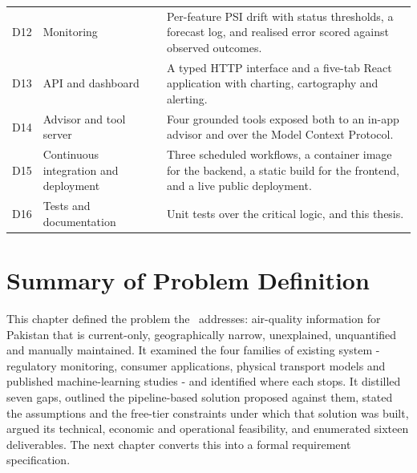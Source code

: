 \begin{xltabular}{\textwidth}{Q{1.3cm} P{4.9cm} Y}
D12 & Monitoring & Per-feature PSI drift with status thresholds, a forecast log,
and realised error scored against observed outcomes. \\
D13 & API and dashboard & A typed HTTP interface and a five-tab React
application with charting, cartography and alerting. \\
D14 & Advisor and tool server & Four grounded tools exposed both to an in-app
advisor and over the Model Context Protocol. \\
D15 & Continuous integration and deployment & Three scheduled workflows, a
container image for the backend, a static build for the frontend, and a live
public deployment. \\
D16 & Tests and documentation & Unit tests over the critical logic, and this
thesis. \\
\end{xltabular}

\section{Summary of Problem Definition}
This chapter defined the problem the \projname\ addresses: air-quality
information for Pakistan that is current-only, geographically narrow,
unexplained, unquantified and manually maintained. It examined the four families
of existing system - regulatory monitoring, consumer applications, physical
transport models and published machine-learning studies - and identified where
each stops. It distilled seven gaps, outlined the pipeline-based solution
proposed against them, stated the assumptions and the free-tier constraints under
which that solution was built, argued its technical, economic and operational
feasibility, and enumerated sixteen deliverables. The next chapter converts this
into a formal requirement specification.
